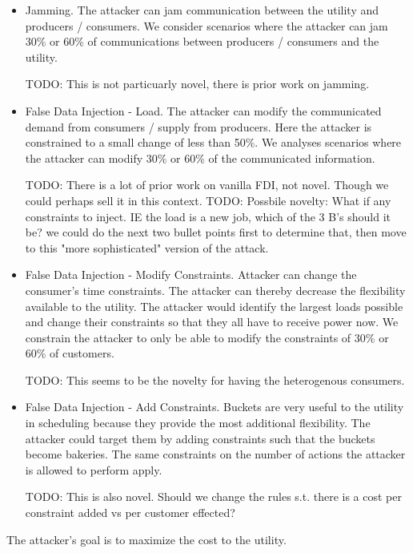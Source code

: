 \documentclass[conference]{IEEEtran}
\begin{document}
\begin{itemize}
\item Jamming. The attacker can jam communication between the utility and producers / consumers.  We consider scenarios 
where the attacker can jam 30\% or 60\% of communications between producers / consumers and the utility.

TODO: This is not particuarly novel, there is prior work on jamming.  

\item False Data Injection - Load. The attacker can modify the communicated demand from consumers / supply from producers.  
Here the attacker is constrained to a small change of less than 50\%.  We analyses scenarios where the attacker can modify
30\% or 60\% of the communicated information.

TODO: There is a lot of prior work on vanilla FDI, not novel.  Though we could perhaps sell it in this context.
TODO: Possbile novelty:  What if any constraints to inject.  IE the load is a new job, which of the 3 B's should it be?
we could do the next two bullet points first to determine that, then move to this "more sophisticated" version of the 
attack.

\item False Data Injection - Modify Constraints. Attacker can change the consumer's time constraints.  The attacker can
thereby decrease the flexibility available to the utility.  The attacker would identify the largest loads possible and 
change their constraints so that they all have to receive power now.  We constrain the attacker to only be able to modify the
constraints of 30\% or 60\% of customers.

TODO:  This seems to be the novelty for having the heterogenous consumers.

\item False Data Injection - Add Constraints.  Buckets are very useful to the utility in scheduling because they provide
the most additional flexibility.  The attacker could target them by adding constraints such that the buckets become bakeries.
The same constraints on the number of actions the attacker is allowed to perform apply.

TODO: This is also novel.  Should we change the rules s.t. there is a cost per constraint added vs per customer effected?

\end{itemize}

The attacker's goal is to maximize the cost to the utility.
\end{document}
